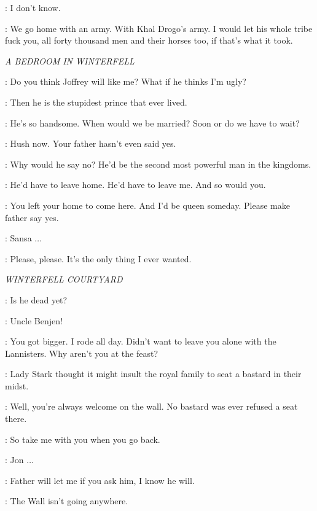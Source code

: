 \DAENERYS: I don't know. 

\VISERYS: We go home with an army. With Khal Drogo's army. I would let his whole tribe fuck you, all forty thousand men and their horses too, if that's what it took. 


\scene

\textit{A BEDROOM IN WINTERFELL} 


\SANSA: Do you think Joffrey will like me? What if he thinks I'm ugly? 

\CATELYN: Then he is the stupidest prince that ever lived. 

\SANSA: He's so handsome. When would we be married? Soon or do we have to wait? 

\CATELYN: Hush now. Your father hasn't even said yes. 

\SANSA: Why would he say no? He'd be the second most powerful man in the kingdoms. 

\CATELYN: He'd have to leave home. He'd have to leave me. And so would you. 

\SANSA: You left your home to come here. And I'd be queen someday. Please make father say yes. 

\CATELYN: Sansa $\ldots$ 

\SANSA: Please, please. It's the only thing I ever wanted. 


\scene

\textit{WINTERFELL COURTYARD} 


\BENJEN: Is he dead yet? 

\JON: Uncle Benjen! 


\BENJEN: You got bigger. I rode all day. Didn't want to leave you alone with the Lannisters. Why aren't you at the feast? 

\JON: Lady Stark thought it might insult the royal family to seat a bastard in their midst. 

\BENJEN: Well, you're always welcome on the wall. No bastard was ever refused a seat there. 

\JON: So take me with you when you go back. 

\BENJEN: Jon $\ldots$ 

\JON: Father will let me if you ask him, I know he will. 

\BENJEN: The Wall isn't going anywhere. 


